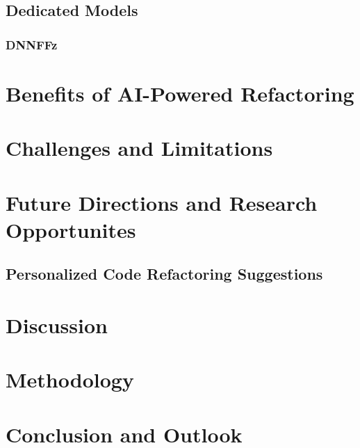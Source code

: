 \documentclass[conference]{IEEEtran}
\begin{document}
\subsection{Dedicated Models}
\subsubsection{DNNFFz}

\section{Benefits of AI-Powered Refactoring}\label{benefits}


\section{Challenges and Limitations}


\section{Future Directions and Research Opportunites}


\subsection{Personalized Code Refactoring Suggestions}
\section{Discussion}


\section{Methodology}

\section{Conclusion and Outlook}

\end{document}
